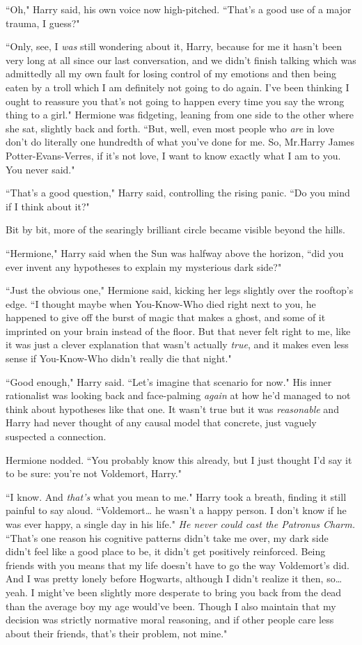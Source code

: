 ``Oh," Harry said, his own voice now high-pitched. ``That's a good use of a major trauma, I guess?"

``Only, see, I \emph{was} still wondering about it, Harry, because for me it hasn't been very long at all since our last conversation, and we didn't finish talking which was admittedly all my own fault for losing control of my emotions and then being eaten by a troll which I am definitely not going to do again. I've been thinking I ought to reassure you that's not going to happen every time you say the wrong thing to a girl." Hermione was fidgeting, leaning from one side to the other where she sat, slightly back and forth. ``But, well, even most people who \emph{are} in love don't do literally one hundredth of what you've done for me. So, Mr.\?Harry James Potter-Evans-Verres, if it's not love, I want to know exactly what I am to you. You never said."

``That's a good question," Harry said, controlling the rising panic. ``Do you mind if I think about it?"

Bit by bit, more of the searingly brilliant circle became visible beyond the hills.

``Hermione," Harry said when the Sun was halfway above the horizon, ``did you ever invent any hypotheses to explain my mysterious dark side?"

``Just the obvious one," Hermione said, kicking her legs slightly over the rooftop's edge. ``I thought maybe when You-Know-Who died right next to you, he happened to give off the burst of magic that makes a ghost, and some of it imprinted on your brain instead of the floor. But that never felt right to me, like it was just a clever explanation that wasn't actually \emph{true}, and it makes even less sense if You-Know-Who didn't really die that night."

``Good enough," Harry said. ``Let's imagine that scenario for now." His inner rationalist was looking back and face-palming \emph{again} at how he'd managed to not think about hypotheses like that one. It wasn't true but it was \emph{reasonable} and Harry had never thought of any causal model that concrete, just vaguely suspected a connection.

Hermione nodded. ``You probably know this already, but I just thought I'd say it to be sure: you're not Voldemort, Harry."

``I know. And \emph{that's} what you mean to me." Harry took a breath, finding it still painful to say aloud. ``Voldemort{\ldots} he wasn't a happy person. I don't know if he was ever happy, a single day in his life." \emph{He never could cast the Patronus Charm.} ``That's one reason his cognitive patterns didn't take me over, my dark side didn't feel like a good place to be, it didn't get positively reinforced. Being friends with you means that my life doesn't have to go the way Voldemort's did. And I was pretty lonely before Hogwarts, although I didn't realize it then, so{\ldots} yeah. I might've been slightly more desperate to bring you back from the dead than the average boy my age would've been. Though I also maintain that my decision was strictly normative moral reasoning, and if other people care less about their friends, that's their problem, not mine."


